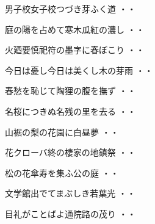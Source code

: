 \begin{shiika}男子校女子校つづき芽ふく道
\hfill{・・}\end{shiika}
\vspace{0.6cm}
\begin{shiika}庭の陽を占めて寒木瓜紅の濃し
\hfill{・・}\end{shiika}
\vspace{0.6cm}
\begin{shiika}火廼要慎祀符の墨字に春ぼこり
\hfill{・・}\end{shiika}
\vspace{0.6cm}
\begin{shiika}今日は憂し今日は美くし木の芽雨
\hfill{・・}\end{shiika}
\vspace{0.6cm}
\begin{shiika}春愁を恥じて陶狸の腹を撫ず
\hfill{・・}\end{shiika}
\vspace{0.6cm}
\begin{shiika}名桜につきぬ名残の里を去る
\hfill{・・}\end{shiika}
\vspace{0.6cm}
\begin{shiika}山裾の梨の花園に白昼夢
\hfill{・・}\end{shiika}
\vspace{0.6cm}
\begin{shiika}花クローバ終の棲家の地鎮祭
\hfill{・・}\end{shiika}
\vspace{0.6cm}
\begin{shiika}松の花傘寿を集ふ公の庭
\hfill{・・}\end{shiika}
\vspace{0.6cm}
\begin{shiika}文学館出でてまぶしき若葉光
\hfill{・・}\end{shiika}
\vspace{0.6cm}
\begin{shiika}目礼がことばよ通院路の茂り
\hfill{・・}\end{shiika}
\vspace{0.6cm}
